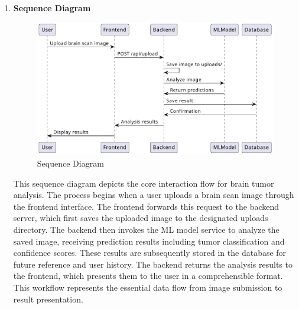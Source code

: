 \begin{enumerate}[label=\roman*.]
    \item \textbf{Sequence Diagram}
          \begin{center}
              \begin{figure}[H]
                  \centering
                  \includegraphics[width=0.9\linewidth]{Images/Highlevel/sequence.pdf}
                  \caption{Sequence Diagram}
                  \label{fig:SequenceDiagram}
              \end{figure}
          \end{center}
          This sequence diagram depicts the core interaction flow for brain tumor analysis. The process begins when a user uploads a brain scan image through the frontend interface. The frontend forwards this request to the backend server, which first saves the uploaded image to the designated uploads directory. The backend then invokes the ML model service to analyze the saved image, receiving prediction results including tumor classification and confidence scores. These results are subsequently stored in the database for future reference and user history. The backend returns the analysis results to the frontend, which presents them to the user in a comprehensible format. This workflow represents the essential data flow from image submission to result presentation.



\end{enumerate}

